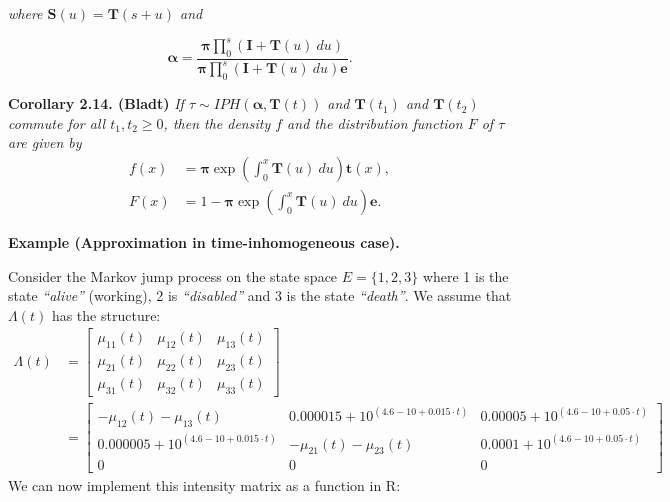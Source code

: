 \documentclass[a4paper,12pt,openany]{book}
\begin{document}
\emph{where \(\mathbf{S}(u)=\mathbf{T}(s+u)\) and }

\[
\mathbf{\alpha}=\frac{\mathbf{\pi}\prod_0^s(\mathbf{I}+\mathbf{T}(u)\ du)}{\mathbf{\pi}\prod_0^s(\mathbf{I}+\mathbf{T}(u)\ du)\mathbf{e}}.
\]

\textbf{Corollary 2.14. (Bladt)} \emph{If \(\tau\sim IPH(\mathbf{\alpha},\mathbf{T}(t))\) and \(\mathbf{T}(t_1)\) and \(\mathbf{T}(t_2)\) commute for all \(t_1,t_2\ge 0\), then the density \(f\) and the distribution function \(F\) of \(\tau\) are given by}
\begin{align*}
f(x)&=\mathbf{\pi}\exp\left(\int_0^x\mathbf{T}(u)\ du\right)\mathbf{t}(x),\\
F(x)&=1-\mathbf{\pi}\exp\left(\int_0^x\mathbf{T}(u)\ du\right)\mathbf{e}.
\end{align*}

\textbf{Example (Approximation in time-inhomogeneous case).}

Consider the Markov jump process on the state space \(E=\{1,2,3\}\) where 1 is the state \emph{``alive''} (working), 2 is \emph{``disabled''} and 3 is the state \emph{``death''}. We assume that \(\Lambda(t)\) has the structure:
\begin{align*}
\Lambda(t)&=\begin{bmatrix}
\mu_{11}(t) & \mu_{12}(t) & \mu_{13}(t)\\
\mu_{21}(t) & \mu_{22}(t) & \mu_{23}(t)\\
\mu_{31}(t) & \mu_{32}(t) & \mu_{33}(t)
\end{bmatrix}\\
&=
\begin{bmatrix}
-\mu_{12}(t)-\mu_{13}(t) &  0.000015 + 10^{(4.6-10+0.015\cdot t)} & 0.00005 + 10^{(4.6-10+0.05\cdot t)}\\
0.000005 + 10^{(4.6-10+0.015\cdot t)} & -\mu_{21}(t)-\mu_{23}(t) & 0.0001 + 10^{(4.6-10+0.05\cdot t)}\\
0 & 0 & 0
\end{bmatrix}
\end{align*}
We can now implement this intensity matrix as a function in R:
\end{document}
